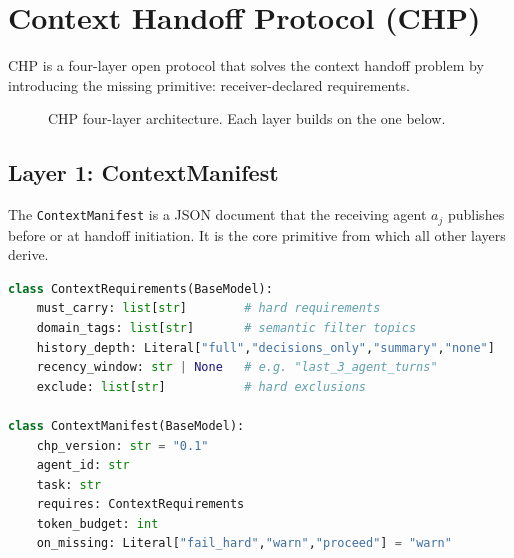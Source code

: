 \documentclass[11pt]{article}
\begin{document}
\section{Context Handoff Protocol (CHP)}
\label{sec:design}

CHP is a four-layer open protocol that solves the context handoff problem by
introducing the missing primitive: receiver-declared requirements.

\begin{figure}[h]
\centering
{}
\caption{CHP four-layer architecture. Each layer builds on the one below.}
\label{fig:layers}
\end{figure}

\subsection{Layer 1: ContextManifest}
\label{sec:manifest}

The \texttt{ContextManifest} is a JSON document that the receiving agent
$a_j$ publishes before or at handoff initiation. It is the core primitive
from which all other layers derive.

\begin{lstlisting}[language=Python, caption={ContextManifest schema (Pydantic v2)}]
class ContextRequirements(BaseModel):
    must_carry: list[str]        # hard requirements
    domain_tags: list[str]       # semantic filter topics
    history_depth: Literal["full","decisions_only","summary","none"]
    recency_window: str | None   # e.g. "last_3_agent_turns"
    exclude: list[str]           # hard exclusions

class ContextManifest(BaseModel):
    chp_version: str = "0.1"
    agent_id: str
    task: str
    requires: ContextRequirements
    token_budget: int
    on_missing: Literal["fail_hard","warn","proceed"] = "warn"
\end{lstlisting}
\end{document}
